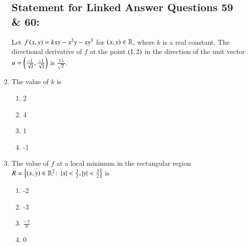 \documentclass[journal]{IEEEtran}
\begin{document}
\begin{enumerate}
\subsection*{Statement for Linked Answer Questions 59 \& 60:}
Let $f\left(x,y\right) = kxy - x^3y - xy^3$ for $\left(x,y\right) \in \mathbb{R}$, where $k$ is a real constant. The directional derivative of $f$ at the point $\left(1,2\right)$ in the direction of the unit vector $u = \left(\frac{-1}{\sqrt{2}}, \frac{-1}{\sqrt{2}}\right)$ is $\frac{15}{\sqrt{2}}$.
\item The value of $k$ is
\begin{multicols}{2}
    \begin{enumerate}
        \item 2
        \item 4
        \item 1
        \item -1
    \end{enumerate}
\end{multicols}
\item The value of $f$ at a local minimum in the rectangular region $R = \left\{\left(x,y\right) \in \mathbb{R}^2 \colon \left\vert x\right\vert< \frac{3}{2} , \left\vert y\right\vert < \frac{3}{2}\right\}$ is
\begin{multicols}{2}
    \begin{enumerate}
        \item -2
        \item -3
        \item $\frac{-7}{8}$
        \item 0
    \end{enumerate}
\end{multicols}
\end{enumerate}
\end{document}
